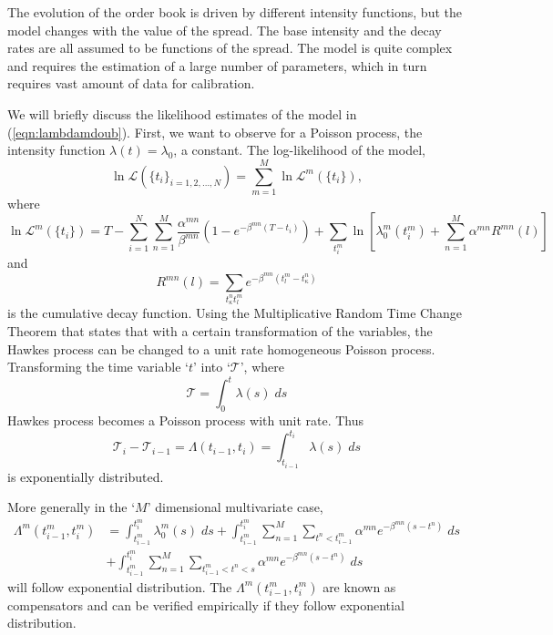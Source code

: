 The evolution of the order book is driven by different intensity functions, but the model changes with the value of the spread. The base intensity and the decay rates are all assumed to be functions of the spread. The model is quite complex and requires the estimation of a large number of parameters, which in turn requires vast amount of data for calibration. 


We will briefly discuss the likelihood estimates of the model in (\ref{eqn:lambdamdoub}). First, we want to observe for a Poisson process, the intensity function $\lambda(t)=\lambda_0$, a constant. The log-likelihood of the model,
	\begin{equation}\label{eqn:loglikemod}
	\ln \mathcal{L}(\{t_i\}_{i=1,2,\ldots,N}) = \sum_{m=1}^M \ln \mathcal{L}^m(\{t_i\}),
	\end{equation}
where
	\[
	\ln \mathcal{L}^m(\{t_i\})= T - \sum_{i=1}^N \sum_{n=1}^M \dfrac{\alpha^{mn}}{\beta^{mn}} (1- e^{-\beta^{mn}(T-t_i)}) + \sum_{t_i^m} \ln[ \lambda_0^m(t_i^m) + \sum_{n=1}^M \alpha^{mn} R^{mn}(l) ]
	\]
and 
	\[
	R^{mn}(l)= \sum_{t_\kappa^n t_l^m} e^{-\beta^{mn}(t_l^m-t_\kappa^n)}
	\]
is the cumulative decay function. Using the Multiplicative Random Time Change Theorem that states that with a certain transformation of the variables, the Hawkes process can be changed to a unit rate homogeneous Poisson process. Transforming the time variable `$t$' into `$\mathcal{T}$', where
	\begin{equation}\label{eqn:calt}
	\mathcal{T}= \int_0^t \lambda(s) \; ds
	\end{equation}
Hawkes process becomes a Poisson process with unit rate. Thus
	\begin{equation}\label{eqn:diffcalt}
	\mathcal{T}_i - \mathcal{T}_{i-1}= \Lambda(t_{i-1},t_i) = \int_{t_{i-1}}^{t_i} \lambda(s) \; ds
	\end{equation}
is exponentially distributed. 


More generally in the `$M$' dimensional multivariate case,
	\[
	\begin{split}
	\Lambda^m(t_{i-1}^m,t_i^m)&= \int_{t_{i-1}^m}^{t_i^m} \lambda_0^m(s) \; ds + \int_{t_{i-1}^m}^{t_i^m} \sum_{n=1}^M \sum_{t^n<t_{i-1}^m} \alpha^{mn} e^{-\beta^{mn}(s-t^n)} \; ds \\
	&+ \int_{t_{i-1}^m}^{t_i^m} \sum_{n=1}^M \sum_{t_{i-1}^m<t^n<s} \alpha^{mn} e^{-\beta^{mn}(s-t^n)} \; ds
	\end{split}
	\]
will follow exponential distribution. The $\Lambda^m(t_{i-1}^m,t_i^m)$ are known as compensators and can be verified empirically if they follow exponential distribution. \twomedskip


